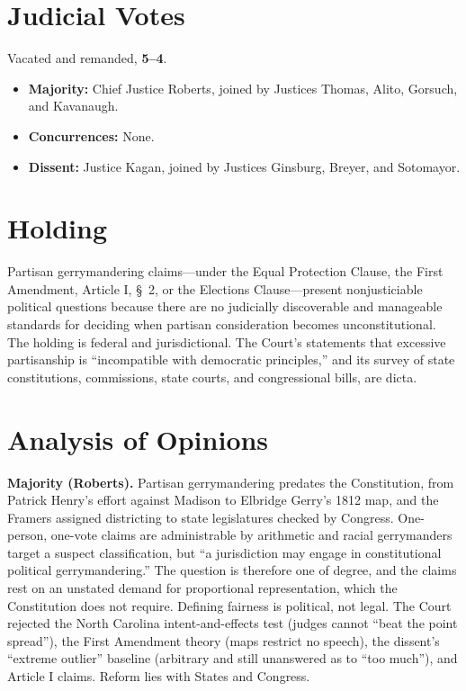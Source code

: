 \documentclass[12pt]{article}
\begin{document}
\section{Judicial Votes}

Vacated and remanded, \textbf{5--4}.
\begin{itemize}
\item \textbf{Majority:} Chief Justice Roberts, joined by Justices Thomas, Alito, Gorsuch, and Kavanaugh.
\item \textbf{Concurrences:} None.
\item \textbf{Dissent:} Justice Kagan, joined by Justices Ginsburg, Breyer, and Sotomayor.
\end{itemize}

\section{Holding}

Partisan gerrymandering claims---under the Equal Protection Clause, the First Amendment, Article I, \S~2, or the Elections Clause---present nonjusticiable political questions because there are no judicially discoverable and manageable standards for deciding when partisan consideration becomes unconstitutional. The holding is federal and jurisdictional. The Court's statements that excessive partisanship is ``incompatible with democratic principles,'' and its survey of state constitutions, commissions, state courts, and congressional bills, are dicta.

\section{Analysis of Opinions}

\textbf{Majority (Roberts).} Partisan gerrymandering predates the Constitution, from Patrick Henry's effort against Madison to Elbridge Gerry's 1812 map, and the Framers assigned districting to state legislatures checked by Congress. One-person, one-vote claims are administrable by arithmetic and racial gerrymanders target a suspect classification, but ``a jurisdiction may engage in constitutional political gerrymandering.'' The question is therefore one of degree, and the claims rest on an unstated demand for proportional representation, which the Constitution does not require. Defining fairness is political, not legal. The Court rejected the North Carolina intent-and-effects test (judges cannot ``beat the point spread''), the First Amendment theory (maps restrict no speech), the dissent's ``extreme outlier'' baseline (arbitrary and still unanswered as to ``too much''), and Article I claims. Reform lies with States and Congress.
\end{document}
